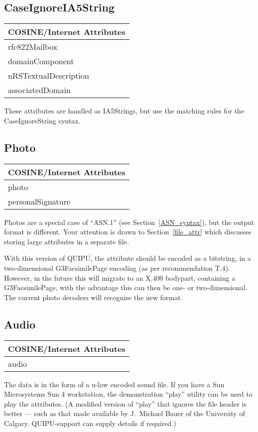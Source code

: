 \subsection{CaseIgnoreIA5String}
\begin{center}\small
\begin{tabular}{|l|}\hline
COSINE/Internet Attributes \\ \hline
	rfc822Mailbox\\
	domainComponent\\
	nRSTextualDescription\\
	associatedDomain\\
\hline
\end{tabular}
\end{center}

These attributes are handled as IA5Strings, but use the matching rules
for the CaseIgnoreString syntax.


\subsection{Photo}
\begin{center}\small
\begin{tabular}{|l|}\hline
COSINE/Internet Attributes \\ \hline
	photo\\
	personalSignature\\
\hline
\end{tabular}
\end{center}
Photos are a special case of ``ASN.1'' (see Section~\ref{ASN_syntax}), but the 
output format is different.
Your attention is drawn to Section~\ref{file_attr} which discusses storing
large attributes in a separate file.

With this version of QUIPU, the attribute should be encoded as a bitstring, in a two-dimensional
G3FacsimilePage encoding
(as per recommendation T.4).
However, in the future this will migrate to an X.400 bodypart,
containing a G3FacsimilePage, with the advantage this can then be one-
or two-dimensional.
The current photo decoders will recognise the new format.

\subsection{Audio}
\begin{center}\small
\begin{tabular}{|l|}\hline
COSINE/Internet Attributes \\ \hline
	audio\\
\hline
\end{tabular}
\end{center}
The data is in the form of a u-law encoded sound file.  If you have a Sun
Microsystems Sun 4 workstation, the demonstration ``play'' utility 
can be used to play the attributes. (A modified version of ``play''
that ignores the file header is better --- such as that made available
by J.~Michael Bauer of the University of Calgary.  QUIPU-support can supply
details if required.)

